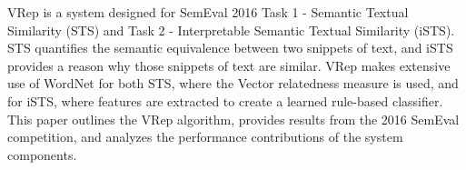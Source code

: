 VRep is a system designed for SemEval 2016 Task 1 - Semantic Textual Similarity (STS) and Task 2 - Interpretable Semantic Textual Similarity (iSTS). STS quantifies the semantic equivalence between two snippets of text, and iSTS provides a reason why those snippets of text are similar. VRep makes extensive use of WordNet for both STS, where the Vector relatedness measure is used, and for iSTS, where features are extracted to create a learned rule-based classifier. This paper outlines the VRep algorithm, provides results from the 2016 SemEval competition, and analyzes the performance contributions of the system components.
